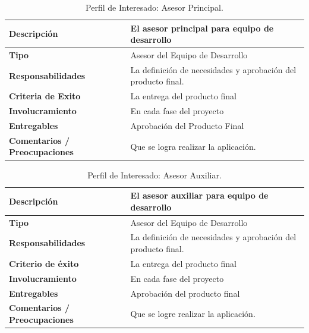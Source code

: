 \vfill

\begin{table}[h!]
  \begin{tabular}{|p{}|p{}|}
    \hline
    \textbf{Descripción} & El asesor principal para equipo de desarrollo \\
    \hline
    \textbf{Tipo} & Asesor del Equipo de Desarrollo \\
    \hline
    \textbf{Responsabilidades} & La definición de necesidades y aprobación del producto final. \\
    \hline
    \textbf{Criteria de Exito} & La entrega del producto final \\
    \hline
    \textbf{Involucramiento} & En cada fase del proyecto \\
    \hline
    \textbf{Entregables} & Aprobación del Producto Final \\
    \hline
    \textbf{Comentarios / Preocupaciones} & Que se logra realizar la aplicación. \\
    \hline
  \end{tabular}
  \caption{Perfil de Interesado: Asesor Principal.}
  \label{per-inter-a-prin}
\end{table}

\vfill

\begin{table}[h!]
  \begin{tabular}{|p{}|p{}|}
    \hline
    \textbf{Descripción} & El asesor auxiliar para equipo de desarrollo \\
    \hline
    \textbf{Tipo} & Asesor del Equipo de Desarrollo \\
    \hline
    \textbf{Responsabilidades} & La definición de necesidades y aprobación del producto final. \\
    \hline
    \textbf{Criterio de éxito} & La entrega del producto final \\
    \hline
    \textbf{Involucramiento} & En cada fase del proyecto \\
    \hline
    \textbf{Entregables} & Aprobación del producto final \\
    \hline
    \textbf{Comentarios / Preocupaciones} & Que se logre realizar la aplicación. \\
    \hline
  \end{tabular}
  \caption{Perfil de Interesado: Asesor Auxiliar.}
  \label{per-inter-a-aux}
\end{table}

